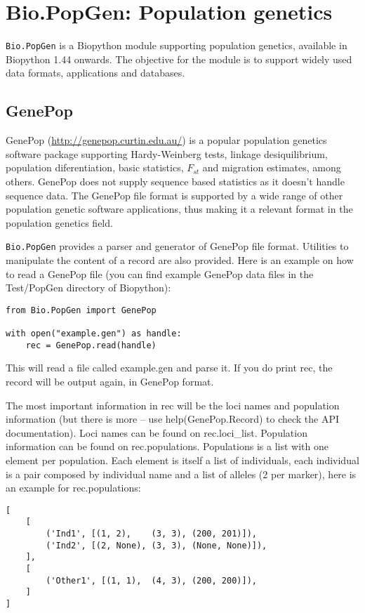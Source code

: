 \chapter{Bio.PopGen: Population genetics}
\label{chapter:popgen}

\verb|Bio.PopGen| is a Biopython module supporting population genetics,
available in Biopython 1.44 onwards. The objective for the module is to
support widely used data formats, applications and databases.

\section{GenePop}

GenePop (\url{http://genepop.curtin.edu.au/}) is a popular population
genetics software package supporting Hardy-Weinberg tests, linkage
desiquilibrium, population diferentiation, basic statistics, $F_{st}$ and
migration estimates, among others. GenePop does not supply sequence
based statistics as it doesn't handle sequence data.
The GenePop file format is supported by a wide range of other population
genetic software applications, thus making it a relevant format in the
population genetics field.

\verb|Bio.PopGen| provides a parser and generator of GenePop file format.
Utilities to manipulate the content of a record are also provided.
Here is an example on how to read a GenePop file (you can find
example GenePop data files in the Test/PopGen directory of Biopython):

\begin{verbatim}
from Bio.PopGen import GenePop

with open("example.gen") as handle:
    rec = GenePop.read(handle)
\end{verbatim}

This will read a file called example.gen and parse it. If you
do print rec, the record will be output again, in GenePop format.

The most important information in rec will be the loci names and
population information (but there is more -- use help(GenePop.Record)
to check the API documentation). Loci names can be found on rec.loci\_list.
Population information can be found on rec.populations.
Populations is a list with one element per population. Each element is itself
a list of individuals, each individual is a pair composed by individual
name and a list of alleles (2 per marker), here is an example for
rec.populations:

\begin{verbatim}
[
    [
        ('Ind1', [(1, 2),    (3, 3), (200, 201)]),
        ('Ind2', [(2, None), (3, 3), (None, None)]),
    ],
    [
        ('Other1', [(1, 1),  (4, 3), (200, 200)]),
    ]
]
\end{verbatim}

